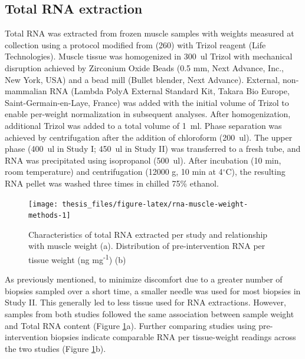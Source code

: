 \documentclass[twoside,10pt]{gihclass} %
\begin{document}
\hypertarget{total-rna-extraction}{%
\subsection{Total RNA extraction}\label{total-rna-extraction}}

Total RNA was extracted from frozen muscle samples with weights measured at collection using a protocol modified from
(260)
with Trizol reagent (Life Technologies).
Muscle tissue was homogenized in \SI{300}{ul} Trizol with mechanical disruption achieved by Zirconium Oxide Beads (0.5 mm, Next Advance, Inc., New York, USA) and a bead mill (Bullet blender, Next Advance). External, non-mammalian RNA (Lambda PolyA External Standard Kit, Takara Bio Europe, Saint-Germain-en-Laye, France) was added with the initial volume of Trizol to enable per-weight normalization in subsequent analyses. After homogenization, additional Trizol was added to a total volume of \SI{1}{ml}. Phase separation was achieved by centrifugation after the addition of chloroform (\SI{200}{ul}). The upper phase (\SI{400}{ul} in Study I; \SI{450}{ul} in Study II) was transferred to a fresh tube, and RNA was precipitated using isopropanol (\SI{500}{ul}). After incubation (10 min, room temperature) and centrifugation (12000 g, 10 min at 4\(^{\circ}\)C), the resulting RNA pellet was washed three times in chilled 75\% ethanol.
\begin{figure}

{\centering \texttt{[image: thesis\_files/figure-latex/rna-muscle-weight-methods-1]} 

}

\caption[Characteristics of total RNA extracted per study]{Characteristics of total RNA extracted per study and relationship with muscle weight (a). Distribution of pre-intervention RNA per tissue weight (ng mg\textsuperscript{-1}) (b)}\label{fig:rna-muscle-weight-methods}
\end{figure}
As previously mentioned, to minimize discomfort due to a greater number of biopsies sampled over a short time, a smaller needle was used for most biopsies in Study II. This generally led to less tissue used for RNA extractions. However, samples from both studies followed the same association between sample weight and Total RNA content (Figure \ref{fig:rna-muscle-weight-methods}a). Further comparing studies using pre-intervention biopsies indicate comparable RNA per tissue-weight readings across the two studies (Figure \ref{fig:rna-muscle-weight-methods}b).
\end{document}
